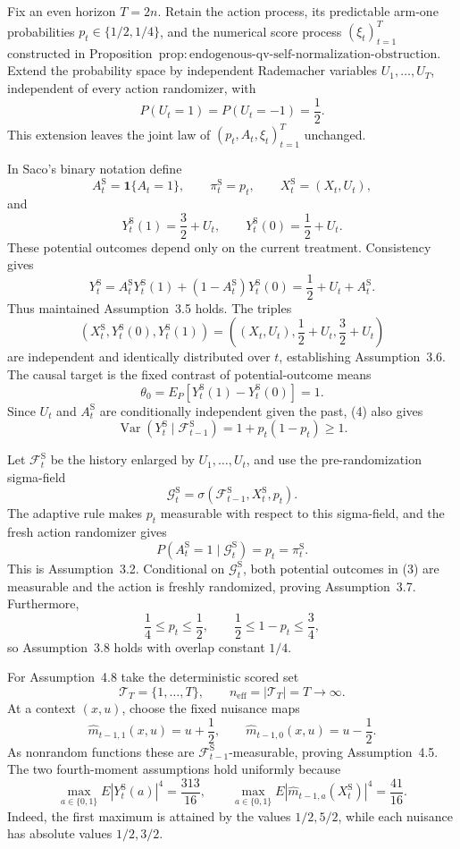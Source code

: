 Fix an even horizon \(T=2n\).  Retain the action process, its predictable arm-one probabilities \(p_t\in\{1/2,1/4\}\), and the numerical score process \((\xi_t)_{t=1}^T\) constructed in Proposition~\(\mathrm{prop:endogenous\text{-}qv\text{-}self\text{-}normalization\text{-}obstruction}\).  Extend the probability space by independent Rademacher variables \(U_1,\ldots,U_T\), independent of every action randomizer, with
\[
P(U_t=1)=P(U_t=-1)=\frac12.
\tag{1}
\]
This extension leaves the joint law of \((p_t,A_t,\xi_t)_{t=1}^T\) unchanged.

In Saco's binary notation define
\[
A_t^{\mathrm S}=\mathbf1\{A_t=1\},
\qquad \pi_t^{\mathrm S}=p_t,
\qquad X_t^{\mathrm S}=(X_t,U_t),
\tag{2}
\]
and
\[
Y_t^{\mathrm S}(1)=\frac32+U_t,
\qquad
Y_t^{\mathrm S}(0)=\frac12+U_t.
\tag{3}
\]
These potential outcomes depend only on the current treatment.  Consistency gives
\[
Y_t^{\mathrm S}
=A_t^{\mathrm S}Y_t^{\mathrm S}(1)+(1-A_t^{\mathrm S})Y_t^{\mathrm S}(0)
=\frac12+U_t+A_t^{\mathrm S}.
\tag{4}
\]
Thus maintained Assumption~3.5 holds.  The triples
\[
(X_t^{\mathrm S},Y_t^{\mathrm S}(0),Y_t^{\mathrm S}(1))
=\left((X_t,U_t),\frac12+U_t,\frac32+U_t\right)
\tag{5}
\]
are independent and identically distributed over \(t\), establishing Assumption~3.6.  The causal target is the fixed contrast of potential-outcome means
\[
\theta_0=E_P[Y_t^{\mathrm S}(1)-Y_t^{\mathrm S}(0)]=1.
\tag{6}
\]
Since \(U_t\) and \(A_t^{\mathrm S}\) are conditionally independent given the past, (4) also gives
\[
\operatorname{Var}(Y_t^{\mathrm S}\mid\mathcal F_{t-1}^{\mathrm S})
=1+p_t(1-p_t)\ge1.
\tag{7}
\]

Let \(\mathcal F_t^{\mathrm S}\) be the history enlarged by \(U_1,\ldots,U_t\), and use the pre-randomization sigma-field
\[
\mathcal G_t^{\mathrm S}=\sigma(\mathcal F_{t-1}^{\mathrm S},X_t^{\mathrm S},p_t).
\tag{8}
\]
The adaptive rule makes \(p_t\) measurable with respect to this sigma-field, and the fresh action randomizer gives
\[
P(A_t^{\mathrm S}=1\mid\mathcal G_t^{\mathrm S})=p_t=\pi_t^{\mathrm S}.
\tag{9}
\]
This is Assumption~3.2.  Conditional on \(\mathcal G_t^{\mathrm S}\), both potential outcomes in (3) are measurable and the action is freshly randomized, proving Assumption~3.7.  Furthermore,
\[
\frac14\le p_t\le\frac12,
\qquad
\frac12\le1-p_t\le\frac34,
\tag{10}
\]
so Assumption~3.8 holds with overlap constant \(1/4\).

For Assumption~4.8 take the deterministic scored set
\[
\mathcal T_T=\{1,\ldots,T\},
\qquad n_{\mathrm{eff}}=|\mathcal T_T|=T\longrightarrow\infty.
\tag{11}
\]
At a context \((x,u)\), choose the fixed nuisance maps
\[
\widehat m_{t-1,1}(x,u)=u+\frac12,
\qquad
\widehat m_{t-1,0}(x,u)=u-\frac12.
\tag{12}
\]
As nonrandom functions these are \(\mathcal F_{t-1}^{\mathrm S}\)-measurable, proving Assumption~4.5.  The two fourth-moment assumptions hold uniformly because
\[
\max_{a\in\{0,1\}}E|Y_t^{\mathrm S}(a)|^4=\frac{313}{16},
\qquad
\max_{a\in\{0,1\}}E|\widehat m_{t-1,a}(X_t^{\mathrm S})|^4=\frac{41}{16}.
\tag{13}
\]
Indeed, the first maximum is attained by the values \(1/2,5/2\), while each nuisance has absolute values \(1/2,3/2\).

